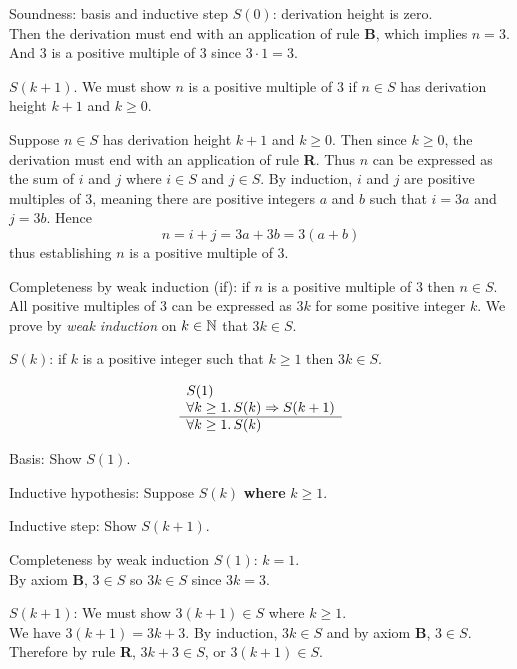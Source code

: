 \begin{wideslide}[bm=,toc=]{Soundness: basis and inductive step}
{\em $S(0)$\/}: derivation height is zero. \\ 
Then the derivation must end with an
application of rule {\bf B}, which implies $n=3$.
And 3 is a positive multiple of 3 since $3\cdot 1=3$.

\vspace{1em}
{\em $S(k + 1)$}.
We must show $n$ is a positive multiple of 3 if $n\in S$ has derivation height $k+1$ and $k\geq 0$.

\vspace{1em}
Suppose $n\in S$ has derivation height $k+1$ and $k\geq 0$.
Then since $k\geq 0$, the derivation must end with an application of rule {\bf R}.
Thus $n$ can be expressed as the sum of $i$ and $j$ where $i\in S$ and $j\in S$.
By induction, $i$ and $j$ are positive multiples of $3$, meaning there are positive integers
$a$ and $b$ such that $i=3a$ and $j=3b$.
Hence 
\[n = i + j = 3a + 3b = 3(a+b)
\]
thus establishing $n$ is a positive multiple of 3.
\end{wideslide}

\begin{wideslide}[bm=,toc=]{Completeness by weak induction}
(if): if $n$ is a positive multiple of 3 then $n\in S$.
All positive multiples of 3 can be expressed as $3k$ for some positive integer $k$.
We prove by {\em weak induction\/} on $k \in \mathbb{N}$ that $3k\in S$.


\vspace{1em}
$S(k)$: if $k$ is a positive integer such that $k\geq 1$ then $3k\in S$.

\begin{displaymath}
\begin{array}[t]{l}
S(1) \\
\forall k\geq 1.\, S(k)\Rightarrow S(k+1) \\
\hline
\forall k\geq 1.\, S(k)
\end{array}
\end{displaymath}

\vspace{1em}
Basis: Show $S(1)$.

\vspace{1em}
Inductive hypothesis: Suppose $S(k)$ {\bf where} $k\geq 1$.

\vspace{1em} 
Inductive step: Show $S(k+1)$.
\end{wideslide}

\begin{wideslide}[bm=,toc=]{Completeness by weak induction}
{\em $S(1)$\/}: $k=1$.\\  
\vspace{1em}
By axiom {\bf B}, $3\in S$ so $3k\in S$ since $3k = 3$.

\vspace{2em}
{\em $S(k + 1)$}:
We must show $3(k+1)\in S$ where $k\geq 1$.\\
\vspace{1em}
We have $3(k+1) = 3k + 3$.
By induction, $3k\in S$ and by axiom {\bf B}, $3\in S$.
Therefore by rule {\bf R}, $3k + 3\in S$, or $3(k+1)\in S$.
\end{wideslide}

